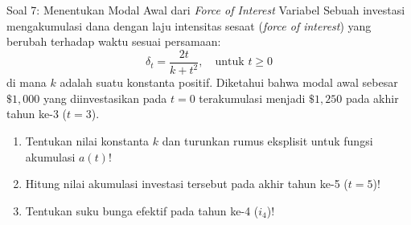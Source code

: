 \documentclass[11pt,a4paper]{article}
\begin{document}
\begin{problembox}{Soal 7: Menentukan Modal Awal dari \textit{Force of Interest} Variabel}
Sebuah investasi mengakumulasi dana dengan laju intensitas sesaat (\textit{force of interest}) yang berubah terhadap waktu sesuai persamaan:
\begin{equation*}
    \delta_t = \frac{2t}{k + t^2}, \quad \text{untuk } t \ge 0
\end{equation*}
di mana $k$ adalah suatu konstanta positif. Diketahui bahwa modal awal sebesar $\$1{,}000$ yang diinvestasikan pada $t = 0$ terakumulasi menjadi $\$1{,}250$ pada akhir tahun ke-3 ($t = 3$).
\begin{enumerate}[label=(\alph*)]
    \item Tentukan nilai konstanta $k$ dan turunkan rumus eksplisit untuk fungsi akumulasi $a(t)$!
    \item Hitung nilai akumulasi investasi tersebut pada akhir tahun ke-5 ($t = 5$)!
    \item Tentukan suku bunga efektif pada tahun ke-4 ($i_4$)!
\end{enumerate}
\end{problembox}
\end{document}
